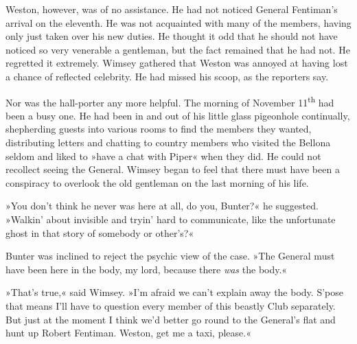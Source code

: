 Weston, however, was of no assistance. He had not noticed General Fentiman's arrival on the eleventh. He was not acquainted with many of the members, having only just taken over his new duties. He thought it odd that he should not have noticed so very venerable a gentleman, but the fact remained that he had not. He regretted it extremely. Wimsey gathered that Weston was annoyed at having lost a chance of reflected celebrity. He had missed his scoop, as the reporters say.

Nor was the hall-porter any more helpful. The morning of November  11\textsuperscript{th} had been a busy one. He had been in and out of his little glass pigeonhole continually, shepherding guests into various rooms to find the members they wanted, distributing letters and chatting to country members who visited the Bellona seldom and liked to »have a chat with Piper« when they did. He could not recollect seeing the General. Wimsey began to feel that there must have been a conspiracy to overlook the old gentleman on the last morning of his life.

»You don't think he never was here at all, do you, Bunter?« he suggested. »Walkin' about invisible and tryin' hard to communicate, like the unfortunate ghost in that story of somebody or other's?«

Bunter was inclined to reject the psychic view of the case. »The General must have been here in the body, my lord, because there \textit{was} the body.«

»That's true,« said Wimsey. »I'm afraid we can't explain away the body. S'pose that means I'll have to question every member of this beastly Club separately. But just at the moment I think we'd better go round to the General's flat and hunt up Robert Fentiman. Weston, get me a taxi, please.«
